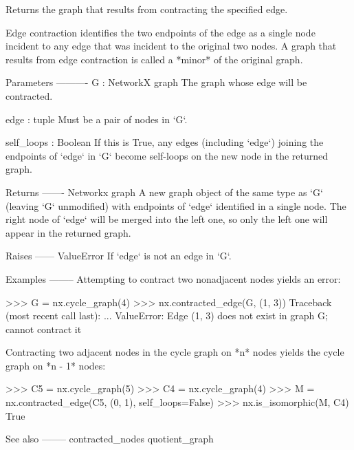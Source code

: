 \begin{DoxyVerb}Returns the graph that results from contracting the specified edge.

Edge contraction identifies the two endpoints of the edge as a single node
incident to any edge that was incident to the original two nodes. A graph
that results from edge contraction is called a *minor* of the original
graph.

Parameters
----------
G : NetworkX graph
   The graph whose edge will be contracted.

edge : tuple
   Must be a pair of nodes in `G`.

self_loops : Boolean
   If this is True, any edges (including `edge`) joining the
   endpoints of `edge` in `G` become self-loops on the new node in the
   returned graph.

Returns
-------
Networkx graph
   A new graph object of the same type as `G` (leaving `G` unmodified)
   with endpoints of `edge` identified in a single node. The right node
   of `edge` will be merged into the left one, so only the left one will
   appear in the returned graph.

Raises
------
ValueError
   If `edge` is not an edge in `G`.

Examples
--------
Attempting to contract two nonadjacent nodes yields an error:

>>> G = nx.cycle_graph(4)
>>> nx.contracted_edge(G, (1, 3))
Traceback (most recent call last):
  ...
ValueError: Edge (1, 3) does not exist in graph G; cannot contract it

Contracting two adjacent nodes in the cycle graph on *n* nodes yields the
cycle graph on *n - 1* nodes:

>>> C5 = nx.cycle_graph(5)
>>> C4 = nx.cycle_graph(4)
>>> M = nx.contracted_edge(C5, (0, 1), self_loops=False)
>>> nx.is_isomorphic(M, C4)
True

See also
--------
contracted_nodes
quotient_graph\end{DoxyVerb}
 \mbox{\label{namespacenetworkx_1_1algorithms_1_1minors_1_1contraction_a5a73989f1385b02ae61c43822ae88786}} 
